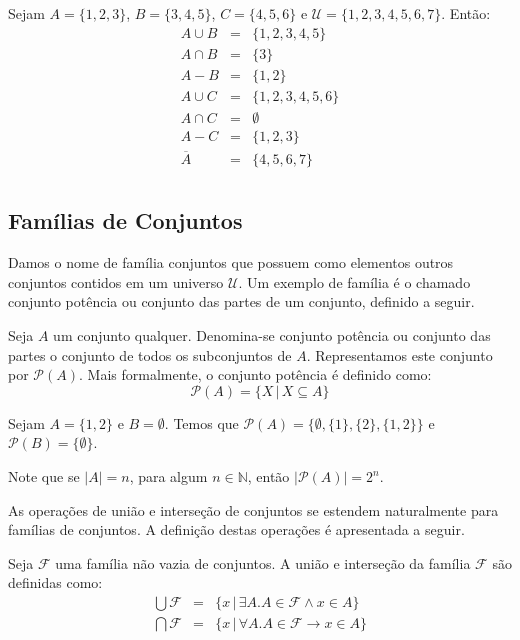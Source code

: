 \begin{Example}
Sejam $A =\{1,2,3\}$, $B = \{3,4,5\}$, $C = \{4,5,6\}$ e $\mathcal{U} =\{1,2,3,4,5,6,7\}$. Então:
\[
\begin{array}{lcl}
  A \cup B & = & \{1,2,3,4,5\} \\
 A \cap B & = & \{3\} \\
 A - B & = & \{1,2\} \\
 A \cup C & = & \{1,2,3,4,5,6\}\\
 A\cap C & = & \emptyset \\
 A - C & = & \{1,2,3\}\\
\overline{A} & = & \{4,5,6,7\}\\
\end{array}
\]
\end{Example}

\subsection{Famílias de Conjuntos}

Damos o nome de família conjuntos que possuem como elementos outros
conjuntos contidos em um universo $\mathcal{U}$. Um exemplo de família
é o chamado conjunto potência ou conjunto das partes de um conjunto,
definido a seguir.

\begin{Definition}
Seja $A$ um conjunto qualquer. Denomina-se conjunto potência ou
conjunto das partes o conjunto de todos os subconjuntos de
$A$. Representamos este conjunto por $\mathcal{P}(A)$. Mais
formalmente, o conjunto potência é definido como:
\[
\mathcal{P}(A) = \{X\,|\, X \subseteq A\}
\]
\end{Definition}

\begin{Example}
Sejam $A = \{1,2\}$ e $B = \emptyset$. Temos que $\mathcal{P}(A) =
\{\emptyset,\{1\},\{2\},\{1,2\}\}$ e $\mathcal{P}(B) =
\{\emptyset\}$.
\end{Example}
Note que se $|A| = n$, para algum $n\in\mathbb{N}$, então
$|\mathcal{P}(A)| = 2^n$.

As operações de união e interseção de conjuntos se estendem
naturalmente para famílias de conjuntos. A definição destas operações
é apresentada a seguir.

\begin{Definition} Seja $\mathcal{F}$
  uma família não vazia de conjuntos. A união e interseção da família
  $\mathcal{F}$ são definidas como:
\[
\begin{array}{lcl}
  \bigcup\mathcal{F} & = & \{x\,|\,\exists A. A \in\mathcal{F}\land x
  \in A\} \\
  \bigcap\mathcal{F} & = & \{x\,|\,\forall A. A \in\mathcal{F}\to x
  \in A\} \\
\end{array}
\]
\end{Definition}

